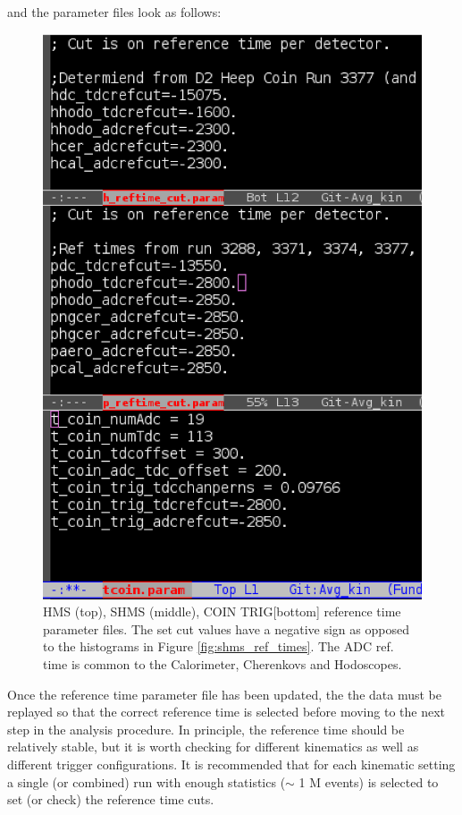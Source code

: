 \documentclass[14pt]{article}
\begin{document}
and the parameter files look as follows:
\begin{figure}[H]
  \captionsetup{justification=raggedright,singlelinecheck=false}
\begin{center}
  \includegraphics[scale=0.5]{plots/reftime_parm.png}
\end{center}
\caption{HMS (top), SHMS (middle), COIN TRIG[bottom] reference time parameter files. The set cut values have a negative sign as opposed to the histograms in Figure \ref{fig:shms_ref_times}.
  The ADC ref. time is common to the Calorimeter, Cherenkovs and Hodoscopes.}
  \label{fig:reftime_parm}
\end{figure}
\noindent Once the reference time parameter file has been updated, the the data must be replayed so that the correct reference time is selected before moving to the
next step in the analysis procedure. In principle, the reference time should be relatively stable, but it is worth checking for different kinematics as well as different
trigger configurations. It is recommended that for each kinematic setting a single (or combined) run with enough statistics ($\sim$ 1 M events) is selected to set (or check) the
reference time cuts.
\end{document}
